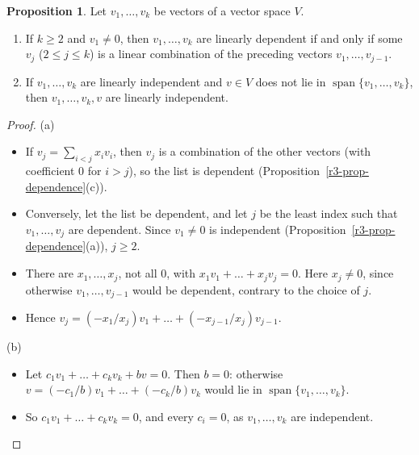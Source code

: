 \documentclass[12pt]{article}
\DeclareMathOperator{\Span}{span}
\theoremstyle{definition}
\newtheorem{proposition}[theorem]{Proposition}
\begin{document}
\begin{proposition}\label{r3-prop-adjoin}
Let \(v_1,\dots,v_k\) be vectors of a vector space \(V\).
\begin{enumerate}
\item If \(k\geqslant2\) and \(v_1\ne0\), then \(v_1,\dots,v_k\) are linearly dependent if and only if
some \(v_j\) (\(2\leqslant j\leqslant k\)) is a linear combination of the preceding vectors
\(v_1,\dots,v_{j-1}\).
\item If \(v_1,\dots,v_k\) are linearly independent and \(v\in V\) does not lie in
\(\Span\{v_1,\dots,v_k\}\), then \(v_1,\dots,v_k,v\) are linearly independent.
\end{enumerate}
\end{proposition}
\begin{proof}
(a)
\begin{itemize}
\item If \(v_j=\sum_{i<j}x_iv_i\), then \(v_j\) is a combination of the other vectors (with
coefficient \(0\) for \(i>j\)), so the list is dependent (Proposition~\ref{r3-prop-dependence}(c)).
\item Conversely, let the list be dependent, and let \(j\) be the least index such that
\(v_1,\dots,v_j\) are dependent. Since \(v_1\ne0\) is independent
(Proposition~\ref{r3-prop-dependence}(a)), \(j\geqslant2\).
\item There are \(x_1,\dots,x_j\), not all \(0\), with \(x_1v_1+\dots+x_jv_j=0\). Here \(x_j\ne0\),
since otherwise \(v_1,\dots,v_{j-1}\) would be dependent, contrary to the choice of \(j\).
\item Hence \(v_j=(-x_1/x_j)v_1+\dots+(-x_{j-1}/x_j)v_{j-1}\).
\end{itemize}
(b)
\begin{itemize}
\item Let \(c_1v_1+\dots+c_kv_k+bv=0\). Then \(b=0\): otherwise
\(v=(-c_1/b)v_1+\dots+(-c_k/b)v_k\) would lie in \(\Span\{v_1,\dots,v_k\}\).
\item So \(c_1v_1+\dots+c_kv_k=0\), and every \(c_i=0\), as \(v_1,\dots,v_k\) are
independent.\qedhere
\end{itemize}
\end{proof}
\end{document}
